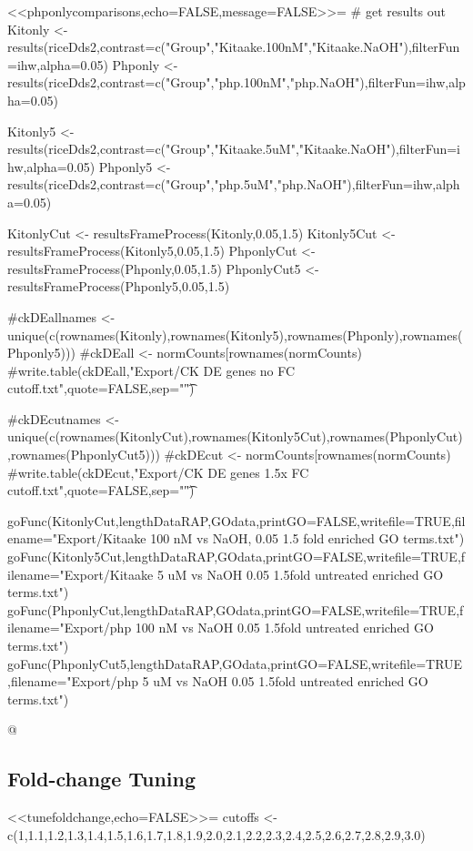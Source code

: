 \documentclass{article}
\begin{document}
<<phponlycomparisons,echo=FALSE,message=FALSE>>=
# get results out
Kitonly <- results(riceDds2,contrast=c("Group","Kitaake.100nM","Kitaake.NaOH"),filterFun=ihw,alpha=0.05)
Phponly <- results(riceDds2,contrast=c("Group","php.100nM","php.NaOH"),filterFun=ihw,alpha=0.05)

Kitonly5 <- results(riceDds2,contrast=c("Group","Kitaake.5uM","Kitaake.NaOH"),filterFun=ihw,alpha=0.05)
Phponly5 <- results(riceDds2,contrast=c("Group","php.5uM","php.NaOH"),filterFun=ihw,alpha=0.05)

KitonlyCut <- resultsFrameProcess(Kitonly,0.05,1.5)
Kitonly5Cut <- resultsFrameProcess(Kitonly5,0.05,1.5)
PhponlyCut <- resultsFrameProcess(Phponly,0.05,1.5)
PhponlyCut5 <- resultsFrameProcess(Phponly5,0.05,1.5)

#ckDEallnames <- unique(c(rownames(Kitonly),rownames(Kitonly5),rownames(Phponly),rownames(Phponly5)))
#ckDEall <- normCounts[rownames(normCounts) %
#write.table(ckDEall,"Export/CK DE genes no FC cutoff.txt",quote=FALSE,sep="\t")

#ckDEcutnames <- unique(c(rownames(KitonlyCut),rownames(Kitonly5Cut),rownames(PhponlyCut),rownames(PhponlyCut5)))
#ckDEcut <- normCounts[rownames(normCounts) %
#write.table(ckDEcut,"Export/CK DE genes 1.5x FC cutoff.txt",quote=FALSE,sep="\t")

goFunc(KitonlyCut,lengthDataRAP,GOdata,printGO=FALSE,writefile=TRUE,filename="Export/Kitaake 100 nM vs NaOH, 0.05 1.5 fold enriched GO terms.txt")
goFunc(Kitonly5Cut,lengthDataRAP,GOdata,printGO=FALSE,writefile=TRUE,filename="Export/Kitaake 5 uM vs NaOH 0.05 1.5fold untreated enriched GO terms.txt")
goFunc(PhponlyCut,lengthDataRAP,GOdata,printGO=FALSE,writefile=TRUE,filename="Export/php 100 nM vs NaOH 0.05 1.5fold untreated enriched GO terms.txt")
goFunc(PhponlyCut5,lengthDataRAP,GOdata,printGO=FALSE,writefile=TRUE,filename="Export/php 5 uM vs NaOH 0.05 1.5fold untreated enriched GO terms.txt")

@

\subsection{Fold-change Tuning}

<<tunefoldchange,echo=FALSE>>=
cutoffs <- c(1,1.1,1.2,1.3,1.4,1.5,1.6,1.7,1.8,1.9,2.0,2.1,2.2,2.3,2.4,2.5,2.6,2.7,2.8,2.9,3.0)
\end{document}
